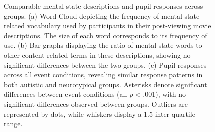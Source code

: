 \begin{figure}[!ht]
    \vspace*{10pt}
	\centering
	\caption{Comparable mental state descriptions and pupil responses across groups. (a) Word Cloud depicting the frequency of mental state-related vocabulary used by participants in their post-viewing movie descriptions. The size of each word corresponds to its frequency of use. (b) Bar graphs displaying the ratio of mental state words to other content-related terms in these descriptions, showing no significant differences between the two groups. (c) Pupil responses across all event conditions, revealing similar response patterns in both autistic and neurotypical groups. Asterisks denote significant differences between event conditions (all \textit{p} < .001), with no significant differences observed between groups. Outliers are represented by dots, while whiskers display a 1.5 inter-quartile range.}
    \vspace*{-10pt}
	\label{fig:beh-pupil}
\end{figure}

